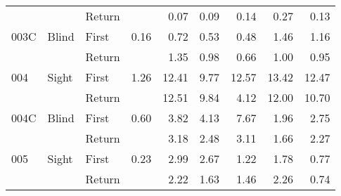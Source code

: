 \begin{table}[!htb]
\begin{tabular}{lllrrrrrr}
    &       & Return &          &   0.07 &   0.09 &                                                  0.14 &                                                   0.27 &    0.13 \\
003C & Blind & First &     0.16 &   0.72 &   0.53 &                                                  0.48 &                                                   1.46 &    1.16 \\
    &       & Return &          &   1.35 &   0.98 &                                                  0.66 &                                                   1.00 &    0.95 \\
004 & Sight & First &     1.26 &  12.41 &   9.77 &                                                 12.57 &                                                  13.42 &   12.47 \\
    &       & Return &          &  12.51 &   9.84 &                                                  4.12 &                                                  12.00 &   10.70 \\
004C & Blind & First &     0.60 &   3.82 &   4.13 &                                                  7.67 &                                                   1.96 &    2.75 \\
    &       & Return &          &   3.18 &   2.48 &                                                  3.11 &                                                   1.66 &    2.27 \\
005 & Sight & First &     0.23 &   2.99 &   2.67 &                                                  1.22 &                                                   1.78 &    0.77 \\
    &       & Return &          &   2.22 &   1.63 &                                                  1.46 &                                                   2.26 &    0.74 \\
\bottomrule
\end{tabular}
\end{table}

